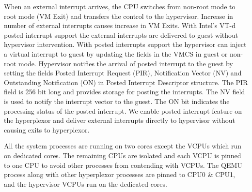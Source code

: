      When an external interrupt arrives, the CPU switches from non-root mode to root mode (VM Exit) and transfers the control to the hypervisor. Increase in number of external interrupts causes increase in VM Exits. With Intel's VT-d posted interrupt support the external interrupts are delivered to guest without hypervisor intervention. With posted interrupts support the hypervisor can inject a virtual interrupt to guest by updating the fields in the VMCS in guest or non-root mode. Hypervisor notifies the arrival of posted interrupt to the guest by setting the fields Posted Interrupt Request (PIR), Notification Vector (NV) and Outstanding Notification (ON) in Posted Interrupt Descriptor structure. The PIR field is 256 bit long and provides storage for posting the interrupts. The NV field is used to notify the interrupt vector to the guest. The ON bit indicates the processing status of the posted interrupt. We enable posted interrupt feature on the hyperplexor and deliver external interrupts directly to hypervisor without causing exits to hyperplexor.  
     
All the system processes are running on two cores except the VCPUs which run on dedicated cores. The remaining CPUs are isolated and each VCPU is pinned to one CPU to avoid other processes from contending with VCPUs. 
The QEMU process along with other hyperplexor processes are pinned to CPU0 \& CPU1, and the hypervisor VCPUs run on the dedicated cores. 

